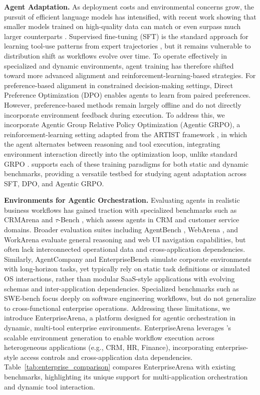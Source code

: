 \documentclass{article}
\theoremstyle{plain}
\theoremstyle{definition}
\theoremstyle{remark}
\begin{document}
\textbf{Agent Adaptation.} 
As deployment costs and environmental concerns grow, the pursuit of efficient language models has intensified, with recent work showing that smaller models trained on high-quality data can match or even surpass much larger counterparts \cite{touvron2023llama}. Supervised fine-tuning (SFT) is the standard approach for learning tool-use patterns from expert trajectories \cite{weifinetuned, qintoolllm}, but it remains vulnerable to distribution shift as workflows evolve over time. To operate effectively in specialized and dynamic environments, agent training has therefore shifted toward more advanced alignment and reinforcement-learning-based strategies. For preference-based alignment in constrained decision-making settings, Direct Preference Optimization (DPO) \cite{rafailov2023direct} enables agents to learn from paired preferences. However, preference-based methods remain largely offline and do not directly incorporate environment feedback during execution. To address this, we incorporate Agentic Group Relative Policy Optimization (Agentic GRPO), a reinforcement-learning setting adapted from the ARTIST framework \cite{singh2025agentic}, in which the agent alternates between reasoning and tool execution, integrating environment interaction directly into the optimization loop, unlike standard GRPO \cite{shao2024deepseekmath}. \name{} supports each of these training paradigms for both static and dynamic benchmarks, providing a versatile testbed for studying agent adaptation across SFT, DPO, and Agentic GRPO.


\textbf{Environments for Agentic Orchestration.} 
Evaluating agents in realistic business workflows has gained traction with specialized benchmarks such as CRMArena \cite{huang2025crmarena, huang2025crmarenapro} and $\tau$-Bench \cite{yao2025tau}, which assess agents in CRM and customer service domains. Broader evaluation suites including AgentBench \cite{liu2024agentbench}, WebArena \cite{zhouwebarena}, and WorkArena \cite{drouin2024workarena} evaluate general reasoning and web UI navigation capabilities, but often lack interconnected operational data and cross-application dependencies. Similarly, AgentCompany \cite{xu2024theagentcompany} and EnterpriseBench \cite{vishwakarma2025can} simulate corporate environments with long-horizon tasks, yet typically rely on static task definitions or simulated OS interactions, rather than modular SaaS-style applications with evolving schemas and inter-application dependencies. Specialized benchmarks such as SWE-bench \cite{yangswe} focus deeply on software engineering workflows, but do not generalize to cross-functional enterprise operations.
Addressing these limitations, we introduce EnterpriseArena, a platform designed for agentic orchestration in dynamic, multi-tool enterprise environments. EnterpriseArena leverages \name{}’s scalable environment generation to enable workflow execution across heterogeneous applications (e.g., CRM, HR, Finance), incorporating enterprise-style access controls and cross-application data dependencies.
 Table~\ref{tab:enterprise_comparison} compares EnterpriseArena with existing benchmarks, highlighting its unique support for multi-application orchestration and dynamic tool interaction.
\end{document}
